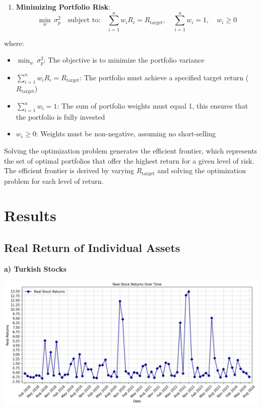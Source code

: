 \documentclass[
]{article}
\providecommand{\tightlist}{%
  \setlength{\itemsep}{0pt}\setlength{\parskip}{0pt}}
\begin{document}
\begin{enumerate}
\def\labelenumi{\arabic{enumi}.}
\setcounter{enumi}{2}
\tightlist
\item
  \textbf{Minimizing Portfolio Risk}: \[
  \min_{w} \, \sigma_p^2 \quad \text{subject to:} \quad \sum_{i=1}^{n} w_i R_i = R_{\text{target}}, \quad \sum_{i=1}^{n} w_i = 1, \quad w_i \geq 0
  \]
\end{enumerate}

where:

\begin{itemize}
\tightlist
\item
  \(\min_{w} \, \sigma_p^2\): The objective is to minimize the portfolio
  variance
\item
  \(\sum_{i=1}^{n} w_i R_i = R_{\text{target}}\): The portfolio must
  achieve a specified target return (\(R_{\text{target}}\))
\item
  \(\sum_{i=1}^{n} w_i = 1\): The sum of portfolio weights must equal 1,
  this ensures that the portfolio is fully invested
\item
  \(w_i \geq 0\): Weights must be non-negative, assuming no
  short-selling
\end{itemize}

Solving the optimization problem generates the efficient frontier, which
represents the set of optimal portfolios that offer the highest return
for a given level of risk. The efficient frontier is derived by varying
\(R_{\text{target}}\) and solving the optimization problem for each
level of return.

\section{Results}\label{results}
\subsection{Real Return of Individual Assets}
\textbf{a) Turkish Stocks}

\includegraphics[width=\textwidth]{real-returns-stocks.png}
\end{document}
